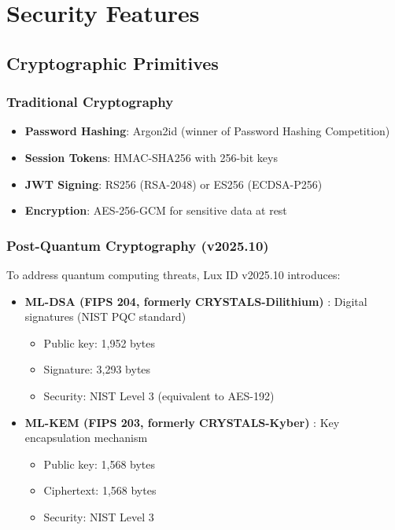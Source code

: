 \section{Security Features}


\subsection{Cryptographic Primitives}

\subsubsection{Traditional Cryptography}

\begin{itemize}
  \item \textbf{Password Hashing}: Argon2id (winner of Password Hashing Competition)
  \item \textbf{Session Tokens}: HMAC-SHA256 with 256-bit keys
  \item \textbf{JWT Signing}: RS256 (RSA-2048) or ES256 (ECDSA-P256)
  \item \textbf{Encryption}: AES-256-GCM for sensitive data at rest
\end{itemize}

\subsubsection{Post-Quantum Cryptography (v2025.10)}

To address quantum computing threats, Lux ID v2025.10 introduces:

\begin{itemize}
  \item \textbf{ML-DSA (FIPS 204, formerly CRYSTALS-Dilithium)} \cite{dilithium}: Digital signatures (NIST PQC standard)
    \begin{itemize}
      \item Public key: 1,952 bytes
      \item Signature: 3,293 bytes
      \item Security: NIST Level 3 (equivalent to AES-192)
    \end{itemize}
  \item \textbf{ML-KEM (FIPS 203, formerly CRYSTALS-Kyber)} \cite{kyber}: Key encapsulation mechanism
    \begin{itemize}
      \item Public key: 1,568 bytes
      \item Ciphertext: 1,568 bytes
      \item Security: NIST Level 3
    \end{itemize}
\end{itemize}

